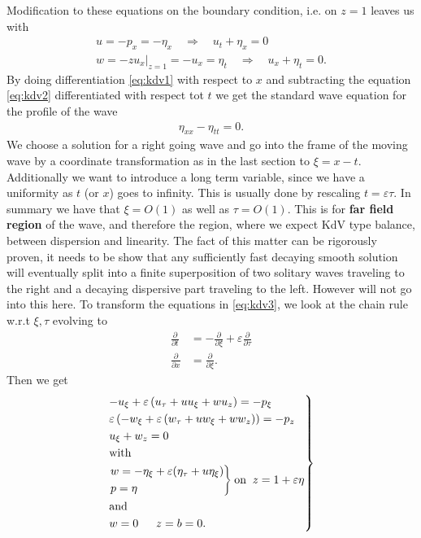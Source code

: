 Modification to these equations on the boundary condition, i.e. on $z=1$
leaves us with
\begin{align}
    u = -p_x = -\eta_x \quad \Rightarrow \quad u_t + \eta_x = 0
    \label{eq:kdv1}\\
    w = -zu_x\Big|_{z=1} = -u_x = \eta_t \quad \Rightarrow \quad u_x + \eta_t
    =0.\label{eq:kdv2}
\end{align}
By doing differentiation \ref{eq:kdv1} with respect to $x$ and subtracting
the equation \ref{eq:kdv2} differentiated with respect tot $t$ we get the
standard wave equation for the profile of the wave
\begin{align}
    \eta_{x x}  - \eta_{t t} = 0 .
\end{align}
We choose a solution for a right going wave and go into the frame of the
moving wave by a coordinate transformation as in the last section to $\xi =
x- t$. Additionally we want to introduce a long term variable, since we have
a uniformity as $t$ (or $x$) goes to infinity. This is usually done by
rescaling $t = \varepsilon \tau$. In summary we have that $\xi = O(1)$ as
well as $\tau = O(1)$. This is for  \textbf{far field region} of the wave, and
therefore the region, where we expect KdV type balance, between dispersion
and linearity. The fact of this matter can be rigorously proven, it needs to
be show that any sufficiently fast decaying smooth solution will eventually
split into a finite superposition of two solitary waves traveling to the
right and a decaying dispersive part traveling to the left. However will not
go into this here. To transform the equations in \ref{eq:kdv3}, we look at
the chain rule w.r.t $\xi ,\tau$ evolving to
\begin{align}
    \frac{\partial }{\partial t} &= -\frac{\partial }{\partial \xi}
    +\varepsilon \frac{\partial }{\partial \tau} \\
    \frac{\partial }{\partial x} &= \frac{\partial }{\partial \xi}.
\end{align}
Then we get
\begin{align}\label{eq:kdv5}
    \begin{drcases}
        -u_\xi + \varepsilon\left(u_\tau + uu_\xi + w u_z  \right)  =
        -p_\xi\\
        \varepsilon\left( -w_\xi + \varepsilon\left( w_\tau + u w_\xi + w w_z
        \right)  \right)  = - p_z\\
        u_\xi + w_z = 0\\
        \text{with}\\
        \begin{drcases}
        w = -\eta_\xi+\varepsilon(\eta_\tau+u \eta_\xi)\\
        p=\eta
        \end{drcases}
        \text{on} \;\; z=1+\varepsilon\eta\\
        \text{and}\\
        w = 0 \quad \;\; z = b =0.
    \end{drcases}
\end{align}
